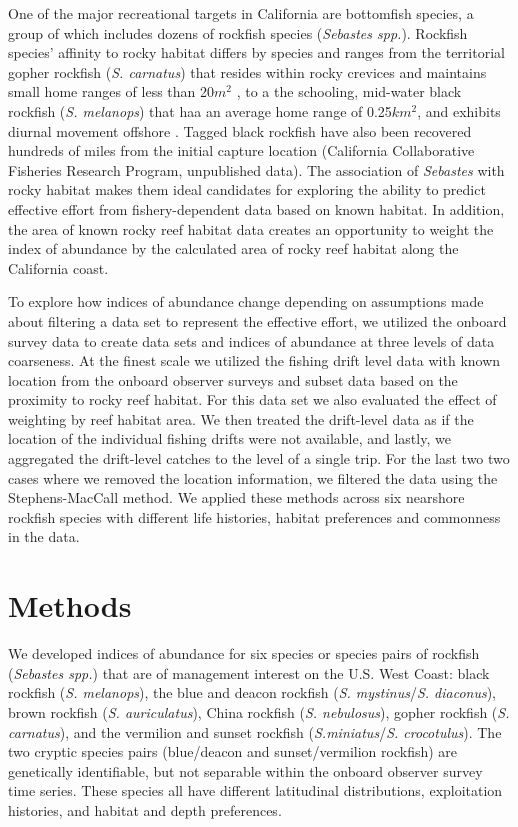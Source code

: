 \documentclass[
  12pt,
  authoryear,
  preprint,
  3p]{elsarticle}
\begin{document}
One of the major recreational targets in California are bottomfish
species, a group of which includes dozens of rockfish species
(\emph{Sebastes spp.}). Rockfish species' affinity to rocky habitat
differs by species and ranges from the territorial gopher rockfish
(\emph{S. carnatus}) that resides within rocky crevices and maintains
small home ranges of less than 20\(m^2\) \citep{Larson:1980:TBB}, to a
the schooling, mid-water black rockfish (\emph{S. melanops}) that haa an
average home range of 0.25\(km^2\), and exhibits diurnal movement
offshore \citep{Green:2011:MSA}. Tagged black rockfish have also been
recovered hundreds of miles from the initial capture location
(California Collaborative Fisheries Research Program, unpublished data).
The association of \emph{Sebastes} with rocky habitat makes them ideal
candidates for exploring the ability to predict effective effort from
fishery-dependent data based on known habitat. In addition, the area of
known rocky reef habitat data creates an opportunity to weight the index
of abundance by the calculated area of rocky reef habitat along the
California coast.

To explore how indices of abundance change depending on assumptions made
about filtering a data set to represent the effective effort, we
utilized the onboard survey data to create data sets and indices of
abundance at three levels of data coarseness. At the finest scale we
utilized the fishing drift level data with known location from the
onboard observer surveys and subset data based on the proximity to rocky
reef habitat. For this data set we also evaluated the effect of
weighting by reef habitat area. We then treated the drift-level data as
if the location of the individual fishing drifts were not available, and
lastly, we aggregated the drift-level catches to the level of a single
trip. For the last two two cases where we removed the location
information, we filtered the data using the Stephens-MacCall method. We
applied these methods across six nearshore rockfish species with
different life histories, habitat preferences and commonness in the
data.

\hypertarget{methods}{%
\section{Methods}\label{methods}}

We developed indices of abundance for six species or species pairs of
rockfish (\emph{Sebastes spp.}) that are of management interest on the
U.S. West Coast: black rockfish (\emph{S. melanops}), the blue and
deacon rockfish (\emph{S. mystinus}/\emph{S. diaconus}), brown rockfish
(\emph{S. auriculatus}), China rockfish (\emph{S. nebulosus}), gopher
rockfish (\emph{S. carnatus}), and the vermilion and sunset rockfish
(\emph{S.miniatus}/\emph{S. crocotulus}). The two cryptic species pairs
(blue/deacon and sunset/vermilion rockfish) are genetically
identifiable, but not separable within the onboard observer survey time
series. These species all have different latitudinal distributions,
exploitation histories, and habitat and depth
preferences\citep{Love:2002:RNP}.
\end{document}
